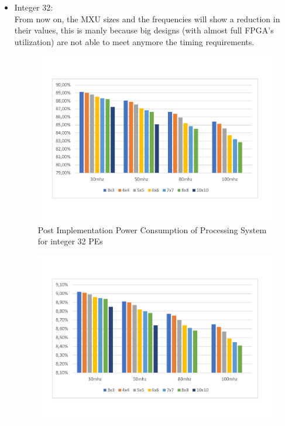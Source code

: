\begin{itemize}
\begin{figure}[!htbp]
\label{fig:dynpowint16ent30}
\end{figure}
\newpage
\item Integer 32:\\
From now on, the MXU sizes and the frequencies will show a reduction in their values, this is manly because big designs (with almost full FPGA's utilization) are not able to meet anymore the timing requirements.
\begin{figure}[!htbp]
\centering
\captionsetup{justification=centering}
\includegraphics[scale=0.5,angle=0]{./figure/graphs/power_ps_int32_freq.pdf}
\caption{Post Implementation Power Consumption of Processing System for integer 32 PEs}
\label{fig:powint32}
\end{figure}
\begin{figure}[!htbp]
\centering
\captionsetup{justification=centering}
\includegraphics[scale=0.5,angle=0]{./figure/graphs/power_plstatic_int32_freq.pdf}

\end{figure}
\end{itemize}

